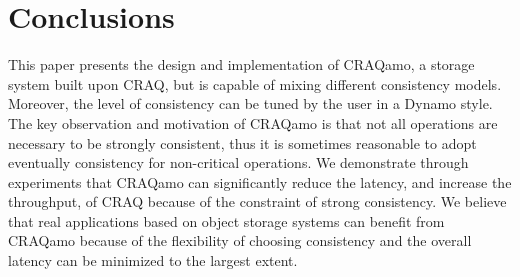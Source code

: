 \section{Conclusions}
This paper presents the design and implementation of CRAQamo, a storage system built upon CRAQ, but is capable of mixing different consistency models. Moreover, the level of consistency can be tuned by the user in a Dynamo style. The key observation and motivation of CRAQamo is that not all operations are necessary to be strongly consistent, thus it is sometimes reasonable to adopt eventually consistency for non-critical operations. We demonstrate through experiments that CRAQamo can significantly reduce the latency, and increase the throughput, of CRAQ because of the constraint of strong consistency. We believe that real applications based on object storage systems can benefit from CRAQamo because of the flexibility of choosing consistency and the overall latency can be minimized to the largest extent.
\label{sec:conclusion}

